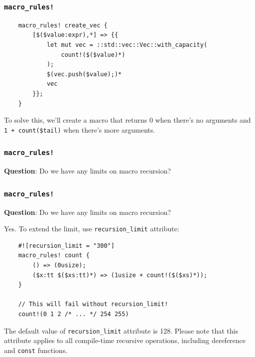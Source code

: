\documentclass[aspectratio=1610,t]{beamer}
\begin{document}

\begin{frame}[fragile]
\frametitle{\texttt{macro\_rules!}}
\begin{verbatim}
    macro_rules! create_vec {
        [$($value:expr),*] => {{
            let mut vec = ::std::vec::Vec::with_capacity(
                count!($($value)*)
            );
            $(vec.push($value);)*
            vec
        }};
    }
\end{verbatim}

To solve this, we'll create a macro that returns 0 when there's no arguments and \texttt{1 + count(\$tail)} when there's more arguments.
\end{frame}


\begin{frame}[fragile]
\frametitle{\texttt{macro\_rules!}}
\textbf{Question}: Do we have any limits on macro recursion?

\end{frame}


\begin{frame}[fragile]
\frametitle{\texttt{macro\_rules!}}
\textbf{Question}: Do we have any limits on macro recursion?

Yes. To extend the limit, use \texttt{recursion\_limit} attribute:

\begin{verbatim}
    #![recursion_limit = "300"]
    macro_rules! count {
        () => (0usize);
        ($x:tt $($xs:tt)*) => (1usize + count!($($xs)*));
    }

    // This will fail without recursion_limit!
    count!(0 1 2 /* ... */ 254 255)
\end{verbatim}

The default value of \texttt{recursion\_limit} attribute is 128. Please note that this attribute applies to all compile-time recursive operations, including dereference and \texttt{const} functions.
\end{frame}

\end{document}
